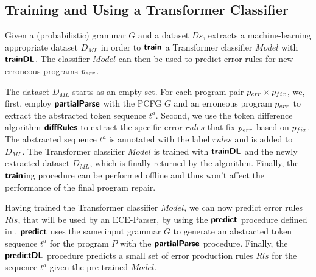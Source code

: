 \subsection{Training and Using a Transformer Classifier}
\label{sec:whole-system:training-classifier}

\begin{figure}[t]
  \centering
  \begin{minipage}[t]{0.49\linewidth}
    \centering
    
  \end{minipage}
  \hspace{0.02\linewidth}
  \begin{minipage}[t]{0.47\linewidth}
    \centering
    
  \end{minipage}
\end{figure}

%
Given a (probabilistic) grammar $G$ and a dataset $Ds$,
 extracts a machine-learning appropriate
dataset $D_{ML}$ in order to $\bm{\mathsf{train}}$ a Transformer classifier $Model$ with
$\bm{\mathsf{trainDL}}$. The classifier $Model$ can then be used to predict error rules
for new erroneous programs $p_{err}$.

The dataset $D_{ML}$ starts as an empty set. For each program pair $p_{err} \times
p_{fix}$, we, first, employ $\bm{\mathsf{partialParse}}$ with the PCFG $G$ and an erroneous
program $p_{err}$ to extract the abstracted token sequence $t^a$. Second, we use
the token difference algorithm $\bm{\mathsf{diffRules}}$ to extract the specific error $rules$
that fix $p_{err}$ based on $p_{fix}$. The abstracted sequence $t^a$ is annotated
with the label $rules$ and is added to $D_{ML}$. The Transformer classifier
$Model$ is trained with $\bm{\mathsf{trainDL}}$ and the newly extracted dataset $D_{ML}$,
which is finally returned by the algorithm. Finally, the $\bm{\mathsf{train}}$ing
procedure can be performed offline and thus won't affect the performance of the
final program repair.

%
Having trained the Transformer classifier $Model$, we can now predict error
rules $Rls$, that will be used by an ECE-Parser, by using the $\bm{\mathsf{predict}}$
procedure defined in . $\bm{\mathsf{predict}}$ uses the same input
grammar $G$ to generate an abstracted token sequence $t^a$ for the program $P$
with the $\bm{\mathsf{partialParse}}$ procedure. Finally, the $\bm{\mathsf{predictDL}}$ procedure
predicts a small set of error production rules $Rls$ for the sequence $t^a$
given the pre-trained $Model$.

